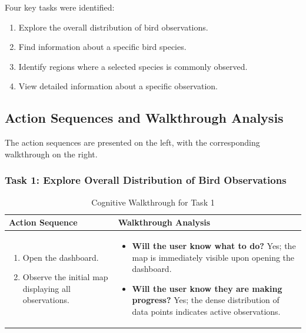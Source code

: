 Four key tasks were identified:

\begin{enumerate} 
    \item Explore the overall distribution of bird observations. 
    \item Find information about a specific bird species. 
    \item Identify regions where a selected species is commonly observed. 
    \item View detailed information about a specific observation. 
\end{enumerate}

\subsection{Action Sequences and Walkthrough Analysis}

The action sequences are presented on the left, with the corresponding walkthrough on the right.

\subsubsection{Task 1: Explore Overall Distribution of Bird Observations}

\begin{table}[H]
    \centering
    \begin{tabular}{p{} | p{}}
        \hline
        \textbf{Action Sequence} & \textbf{Walkthrough Analysis} \\
        \hline
        \begin{enumerate}
            \item Open the dashboard.
            \item Observe the initial map displaying all observations.
        \end{enumerate} &
        \begin{itemize}
            \item \textbf{Will the user know what to do?} Yes; the map is immediately visible upon opening the dashboard.
            \item \textbf{Will the user know they are making progress?} Yes; the dense distribution of data points indicates active observations.
        \end{itemize} \\
        \hline
    \end{tabular}
    \caption{Cognitive Walkthrough for Task 1}
    \label{tab:task1_walkthrough}
\end{table}

